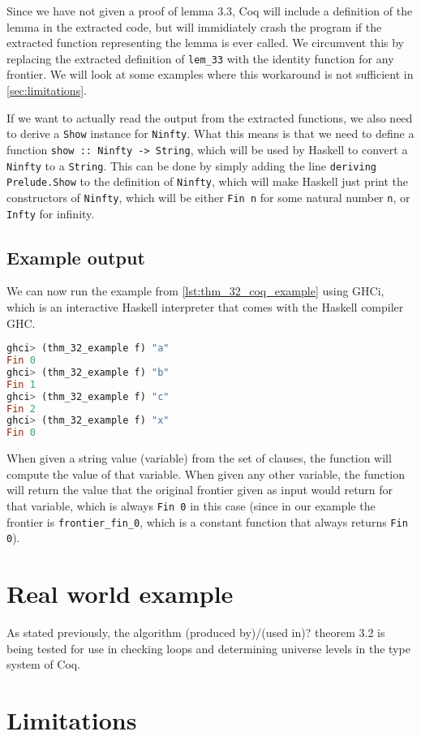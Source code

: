 Since we have not given a proof of lemma 3.3, Coq will include a definition of the lemma in the extracted code,
but will immidiately crash the program if the extracted function representing the lemma is ever called.
We circumvent this by replacing the extracted definition of \lstinline{lem_33} with the identity function
for any frontier. We will look at some examples where this workaround is not sufficient in
\autoref{sec:limitations}.

If we want to actually read the output from the extracted functions, we also need to
derive a \lstinline{Show} instance for \lstinline{Ninfty}.
What this means is that we need to define a function \lstinline{show :: Ninfty -> String},
which will be used by Haskell to convert a \lstinline{Ninfty} to a \lstinline{String}.
This can be done by simply adding the line \lstinline{deriving Prelude.Show} to the definition of \lstinline{Ninfty},
which will make Haskell just print the constructors of \lstinline{Ninfty},
which will be either \lstinline{Fin n} for some natural number \lstinline{n},
or \lstinline{Infty} for infinity.

\subsection{Example output}

We can now run the example from \autoref{lst:thm_32_coq_example} using GHCi,
which is an interactive Haskell interpreter that comes with the Haskell compiler GHC.

\begin{minipage}{\linewidth}
\begin{lstlisting}[language=Haskell, label={lst:thm_32_haskell_output}, caption={\lstinline{thm_32} example output}]
ghci> (thm_32_example f) "a"
Fin 0
ghci> (thm_32_example f) "b"
Fin 1
ghci> (thm_32_example f) "c"
Fin 2
ghci> (thm_32_example f) "x"
Fin 0
\end{lstlisting}
\end{minipage}

When given a string value (variable) from the set of clauses, the function will compute the value of that variable.
When given any other variable, the function will return the value that the original frontier given as input
would return for that variable, which is always \lstinline{Fin 0} in this case
(since in our example the frontier is \lstinline{frontier_fin_0},
which is a constant function that always returns \lstinline{Fin 0}).

\section{Real world example}

As stated previously, the algorithm (produced by)/(used in)? theorem 3.2 is being
tested for use in checking loops and determining universe levels in the
type system of Coq.

\section{Limitations}
\label{sec:limitations}
